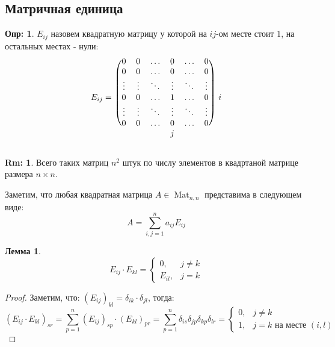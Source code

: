 \documentclass[12pt]{article}
\theoremstyle{definition}
\newtheorem{defn}{Опр:}
\newtheorem{rem}{Rm:}
\newtheorem{lemma}{Лемма}
\newcommand{\ddsum}[2]{\displaystyle\sum\limits_{#1}^{#2}}
\newcommand{\mat}[2]{\operatorname{Mat}_{#1, #2}}
\begin{document}
\subsection*{Матричная единица}
\begin{defn}
	 $E_{ij}$ назовем квадратную матрицу у которой на $ij$-ом месте стоит $1$, на остальных местах - нули:
	$$
		\begin{blockarray}{cccccccc}
			\begin{block}{c(cccccc)c}
				& 0 & 0 & \dotsc &  0 & \dotsc & 0 & \\
				& 0 & 0 & \dotsc &  0 & \dotsc & 0 &\\
				& \vdots & \vdots &  \ddots & \vdots & \ddots & \vdots &\\
				E_{ij} = & 0 & 0 & \dotsc & 1 & \dotsc & 0 & i\\
				& \vdots & \vdots & \ddots & \vdots & \ddots & \vdots &\\
				& 0 & 0 & \dotsc & 0 & \dotsc & 0 &\\
			\end{block}
			&&&&j&&&
		\end{blockarray}
	$$
\end{defn}
\begin{rem}
	Всего таких матриц $n^2$ штук по числу элементов в квадртаной матрице размера $n \times n$.
\end{rem}
Заметим, что любая квадратная матрица $A \in \mat{n}{n}$ представима в следующем виде:
$$
	A = \ddsum{i, j = 1}{n}a_{ij}E_{ij}
$$
\begin{lemma}
	$$
		E_{ij}{\cdot}E_{kl} = 
		\begin{cases}
			0, & j \neq k\\
			E_{il}, & j = k 
		\end{cases}
	$$
\end{lemma}
\begin{proof}
	Заметим, что: $(E_{ij})_{kl} = \delta_{ik}{\cdot}\delta_{jl}$, тогда:
	$$
		(E_{ij}{\cdot}E_{kl})_{sr} = \ddsum{p = 1}{n}(E_{ij})_{sp}{\cdot}(E_{kl})_{pr} = \ddsum{p=1}{n}\delta_{is}\delta_{jp}\delta_{kp}\delta_{lr} = 
		\begin{cases}
			0, & j \neq k \\
			1, & j = k \text{ на месте } (i,l)
		\end{cases}
	$$
\end{proof}
\end{document}
